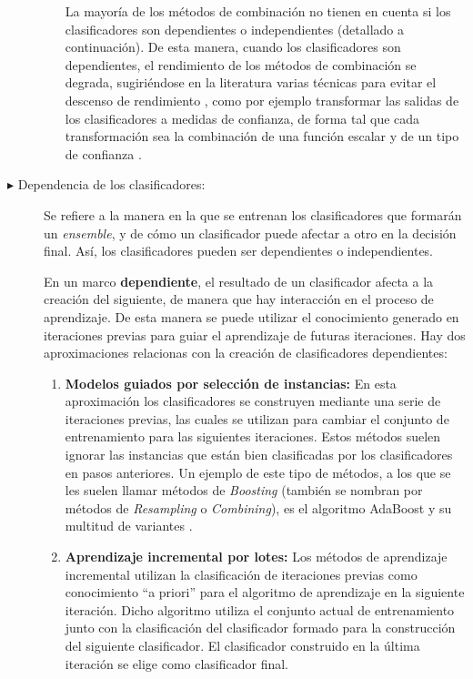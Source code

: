 \begin{description}
\begin{enumerate}
La mayoría de los métodos de combinación no tienen en cuenta si los clasificadores son
dependientes o independientes (detallado a continuación). De esta manera, cuando los
clasificadores son dependientes, el rendimiento de los métodos de combinación se degrada,
sugiriéndose en la literatura varias técnicas para evitar el descenso de rendimiento
\cite{Rokach2009}, como por ejemplo transformar las salidas de los clasificadores a
medidas de confianza, de forma tal que cada transformación sea la combinación de una
función escalar y de un tipo de confianza \cite{Liu2005}.
\end{enumerate}
\item[$\blacktriangleright$ Dependencia de los clasificadores:] Se refiere a la manera
en la que se entrenan
los clasificadores que formarán un \textit{ensemble}, y de cómo un clasificador puede
afectar a otro en la decisión final. Así, los clasificadores pueden ser dependientes
o independientes.

En un marco \textbf{dependiente}, el resultado de un clasificador afecta a la
creación del siguiente, de manera que hay interacción en el proceso de aprendizaje. De
esta manera se puede utilizar el conocimiento generado en iteraciones previas para guiar
el aprendizaje de futuras iteraciones. Hay dos aproximaciones \cite{Rokach2009} relacionas
con la creación de clasificadores dependientes:
\begin{enumerate}
\item \textbf{Modelos guiados por selección de instancias:} En esta aproximación
los clasificadores se construyen mediante una serie de iteraciones previas, las cuales se
utilizan para cambiar el conjunto de entrenamiento para las siguientes iteraciones.
Estos métodos suelen ignorar las instancias que están bien clasificadas por los
clasificadores en pasos anteriores. Un ejemplo de este tipo de métodos, a los que se les
suelen llamar métodos de \textit{Boosting} (también se nombran por métodos de
\textit{Resampling} o \textit{Combining}), es el algoritmo AdaBoost y su
multitud de variantes \cite{Rokach2009}.
\item \textbf{Aprendizaje incremental por lotes:} Los métodos de aprendizaje incremental
utilizan la clasificación de iteraciones previas como conocimiento ``a priori'' para el
algoritmo de aprendizaje en la siguiente iteración. Dicho algoritmo utiliza el conjunto
actual de entrenamiento junto con la clasificación del clasificador formado para la
construcción del siguiente clasificador. El clasificador construido en la última iteración
se elige como clasificador final.
\end{enumerate}


\end{description}

